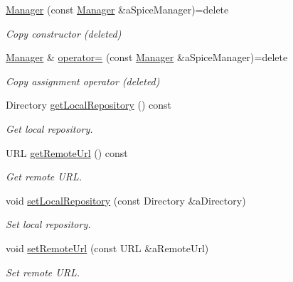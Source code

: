 \begin{DoxyCompactItemize}
\item 
\hyperlink{classlibrary_1_1physics_1_1env_1_1ephem_1_1spice_1_1_manager_aa4ec6e585791cf27dfa66a3b0ced57fb}{Manager} (const \hyperlink{classlibrary_1_1physics_1_1env_1_1ephem_1_1spice_1_1_manager}{Manager} \&a\+Spice\+Manager)=delete
\begin{DoxyCompactList}\small\item\em Copy constructor (deleted) \end{DoxyCompactList}\item 
\hyperlink{classlibrary_1_1physics_1_1env_1_1ephem_1_1spice_1_1_manager}{Manager} \& \hyperlink{classlibrary_1_1physics_1_1env_1_1ephem_1_1spice_1_1_manager_a9cefb3ab334147e42eaadaa1229b0048}{operator=} (const \hyperlink{classlibrary_1_1physics_1_1env_1_1ephem_1_1spice_1_1_manager}{Manager} \&a\+Spice\+Manager)=delete
\begin{DoxyCompactList}\small\item\em Copy assignment operator (deleted) \end{DoxyCompactList}\item 
Directory \hyperlink{classlibrary_1_1physics_1_1env_1_1ephem_1_1spice_1_1_manager_a88cdb0d3353d86f1eabad722cfb8ba2b}{get\+Local\+Repository} () const
\begin{DoxyCompactList}\small\item\em Get local repository. \end{DoxyCompactList}\item 
U\+RL \hyperlink{classlibrary_1_1physics_1_1env_1_1ephem_1_1spice_1_1_manager_a583bd086060b607e617ee1676fa54f67}{get\+Remote\+Url} () const
\begin{DoxyCompactList}\small\item\em Get remote U\+RL. \end{DoxyCompactList}\item 
void \hyperlink{classlibrary_1_1physics_1_1env_1_1ephem_1_1spice_1_1_manager_a98450d702f95a67b53fe3f08ba6e8625}{set\+Local\+Repository} (const Directory \&a\+Directory)
\begin{DoxyCompactList}\small\item\em Set local repository. \end{DoxyCompactList}\item 
void \hyperlink{classlibrary_1_1physics_1_1env_1_1ephem_1_1spice_1_1_manager_acddf543ad7c3ba467311166dc2192458}{set\+Remote\+Url} (const U\+RL \&a\+Remote\+Url)
\begin{DoxyCompactList}\small\item\em Set remote U\+RL. \end{DoxyCompactList}\item 

\end{DoxyCompactItemize}
